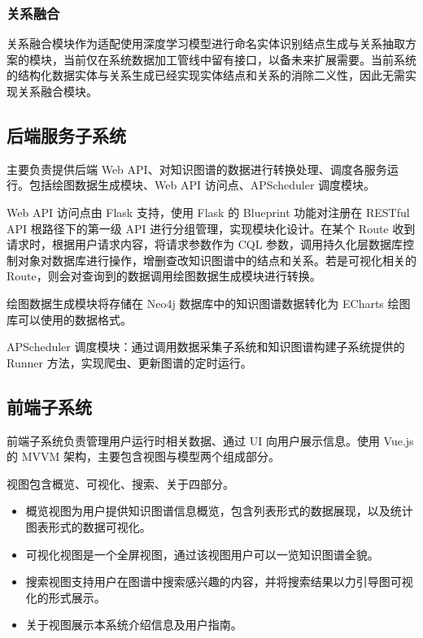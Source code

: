 \documentclass[a4paper,AutoFakeBold,oneside,12pt]{book}
\begin{document}
\subsubsection{关系融合}

关系融合模块作为适配使用深度学习模型进行命名实体识别结点生成与关系抽取方案的模块，当前仅在系统数据加工管线中留有接口，以备未来扩展需要。当前系统的结构化数据实体与关系生成已经实现实体结点和关系的消除二义性，因此无需实现关系融合模块。

\subsection{后端服务子系统}

主要负责提供后端 Web API、对知识图谱的数据进行转换处理、调度各服务运行。包括绘图数据生成模块、Web API 访问点、APScheduler 调度模块。

Web API 访问点由 Flask 支持，使用 Flask 的 Blueprint 功能对注册在 RESTful API 根路径下的第一级 API 进行分组管理，实现模块化设计。在某个 Route 收到请求时，根据用户请求内容，将请求参数作为 CQL 参数，调用持久化层数据库控制对象对数据库进行操作，增删查改知识图谱中的结点和关系。若是可视化相关的 Route，则会对查询到的数据调用绘图数据生成模块进行转换。

绘图数据生成模块将存储在 Neo4j 数据库中的知识图谱数据转化为 ECharts 绘图库可以使用的数据格式。

APScheduler 调度模块：通过调用数据采集子系统和知识图谱构建子系统提供的 Runner 方法，实现爬虫、更新图谱的定时运行。

\subsection{前端子系统}

前端子系统负责管理用户运行时相关数据、通过 UI 向用户展示信息。使用 Vue.js 的 MVVM 架构，主要包含视图与模型两个组成部分。

视图包含概览、可视化、搜索、关于四部分。

\begin{itemize}
	\item 概览视图为用户提供知识图谱信息概览，包含列表形式的数据展现，以及统计图表形式的数据可视化。
	\item 可视化视图是一个全屏视图，通过该视图用户可以一览知识图谱全貌。
	\item 搜索视图支持用户在图谱中搜索感兴趣的内容，并将搜索结果以力引导图可视化的形式展示。
	\item 关于视图展示本系统介绍信息及用户指南。
\end{itemize}
\end{document}
